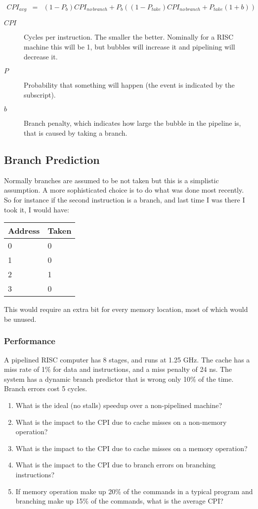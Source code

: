 \begin{eqnarray*}
  CPI_{avg} &=& (1-P_b)CPI_{no\,branch} + P_b((1-P_{take})CPI_{no\,branch}+P_{take}(1+b))
\end{eqnarray*}
\begin{description}
    \item[$CPI$] Cycles per instruction.  The smaller the better.  Nominally for a RISC machine this will be 1, but bubbles will increase it and pipelining will decrease it.
    \item[$P$] Probability that something will happen (the event is indicated by the subscript).
    \item[$b$] Branch penalty, which indicates how large the bubble in the pipeline is, that is caused by taking a branch.
\end{description}

\subsection{Branch Prediction}

Normally branches are assumed to be not taken but this is a simplistic assumption.  A more sophisticated choice is to do what was done most recently.  So for instance if the second instruction is a branch, and last time I was there I took it, I would have:

\begin{tabular}{l|l}
  Address & Taken \\
  \hline
  0 & 0 \\
  1 & 0 \\
  2 & 1 \\
  3 & 0 \\
\end{tabular}

This would require an extra bit for every memory location, most of which would be unused.

\subsubsection{Performance}

A pipelined RISC computer has 8 stages, and runs at 1.25 GHz.  The cache has a miss rate of 1\% for data and instructions, and a miss penalty of 24 ns.  The system has a dynamic branch predictor that is wrong only 10\% of the time.  Branch errors cost 5 cycles.
\begin{enumerate}
\item What is the ideal (no stalls) speedup over a non-pipelined machine?
\item What is the impact to the CPI due to cache misses on a non-memory operation?
\item What is the impact to the CPI due to cache misses on a memory operation?
\item What is the impact to the CPI due to branch errors on branching instructions?
\item If memory operation make up 20\% of the commands in a typical program and branching make up 15\% of the commands, what is the average CPI?
\end{enumerate}

